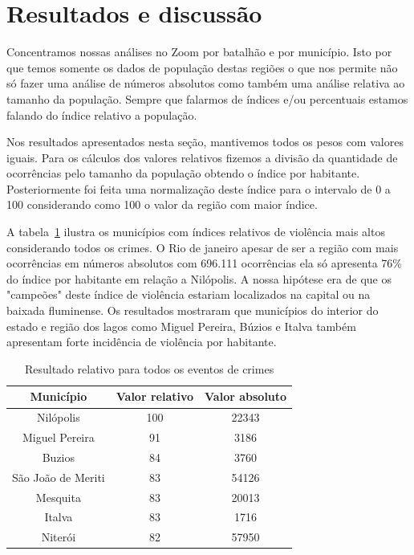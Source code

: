 \documentclass[10pt,conference]{IEEEtran}
\begin{document}
\section{Resultados e discussão}

Concentramos nossas análises no Zoom por batalhão e por município. Isto por que temos somente os dados de população destas regiões o que nos permite não só fazer uma análise de números absolutos como também uma análise relativa ao tamanho da população. Sempre que falarmos de índices e/ou percentuais estamos falando do índice relativo a população.

Nos resultados apresentados nesta seção, mantivemos todos os pesos com valores iguais. Para os cálculos dos valores relativos fizemos a divisão da quantidade de ocorrências pelo tamanho da população obtendo o índice por habitante. Posteriormente foi feita uma normalização deste índice para o intervalo de 0 a 100 considerando como 100 o valor da região com maior índice. 

A tabela~\ref{table_result_crimes_geral} ilustra os municípios com índices relativos de violência mais altos considerando todos os crimes. O Rio de janeiro apesar de ser a região com mais ocorrências em números absolutos com 696.111 ocorrências ela só apresenta 76\% do índice por habitante em relação a Nilópolis. A nossa hipótese era de que os "campeões" deste índice de violência estariam localizados na capital ou na baixada fluminense. Os resultados mostraram que municípios do interior do estado e região dos lagos como Miguel Pereira, Búzios e Italva também apresentam forte incidência de violência por habitante.

\begin{table}[]
\renewcommand{\arraystretch}{1.3}
\caption{Resultado relativo para todos os eventos de crimes}
\label{table_result_crimes_geral}
\centering
\begin{tabular}{|c|c|c|}
\hline
\textbf{Município} & \textbf{Valor relativo} & \textbf{Valor absoluto} \\
\hline
Nilópolis & 100 & 22343\\
\hline
Miguel Pereira & 91 & 3186\\
\hline
Buzios & 84 & 3760\\
\hline
São João de Meriti & 83 & 54126\\
\hline
Mesquita & 83 & 20013\\
\hline
Italva & 83 & 1716\\
\hline
Niterói & 82 & 57950\\
\hline
\end{tabular}
\end{table}
\end{document}
